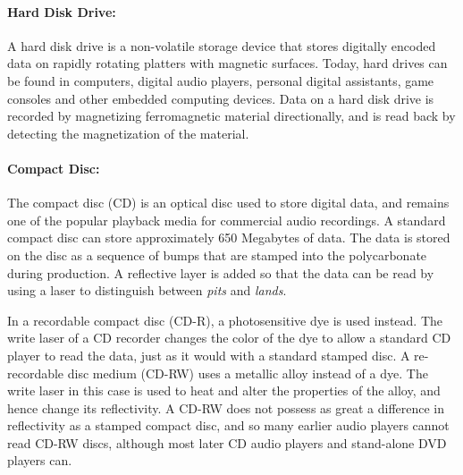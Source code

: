 \paragraph{Hard Disk Drive:}
A hard disk drive is a non-volatile storage device that stores digitally encoded data on rapidly rotating platters with magnetic surfaces.
Today, hard drives can be found in computers, digital audio players, personal digital assistants, game consoles and other embedded computing devices.
Data on a hard disk drive is recorded by magnetizing ferromagnetic material directionally, and is read back by detecting the magnetization of the material.

\paragraph{Compact Disc:}
The compact disc (CD) is an optical disc used to store digital data, and remains one of the popular playback media for commercial audio recordings.
A standard compact disc can store approximately 650 Megabytes of data.
The data is stored on the disc as a sequence of bumps that are stamped into the polycarbonate during production.
A reflective layer is added so that the data can be read by using a laser to distinguish between \emph{pits} and \emph{lands}.

In a recordable compact disc (CD-R), a photosensitive dye is used instead.
The write laser of a CD recorder changes the color of the dye to allow a standard CD player to read the data, just as it would with a standard stamped disc.
A re-recordable disc medium (CD-RW) uses a metallic alloy instead of a dye.
The write laser in this case is used to heat and alter the properties of the alloy, and hence change its reflectivity.
A CD-RW does not possess as great a difference in reflectivity as a stamped compact disc, and so many earlier audio players cannot read CD-RW discs, although most later CD audio players and stand-alone DVD players can. 


